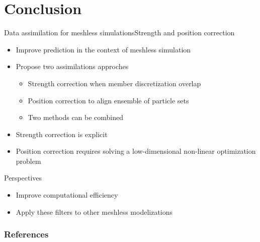 \documentclass[aspectratio=169]{beamer} %
\begin{document}
\section{Conclusion}
\begin{frame}{Data assimilation for meshless simulations}{Strength and position correction}

    \begin{itemize}
        \item Improve prediction in the context of meshless simulation
        \item Propose two assimilations approches
              \begin{itemize}
                  \item Strength correction when member discretization overlap
                  \item Position correction to align ensemble of particle sets
                  \item Two methods can be combined
              \end{itemize}
        \item Strength correction is explicit %
        \item Position correction requires solving a low-dimensional non-linear optimization problem
    \end{itemize}
    \vfill
    \begin{block}{Perspectives}
        \begin{itemize}
            \item Improve computational efficiency
            \item Apply these filters to other meshless modelizations
        \end{itemize}
    \end{block}
\end{frame}

\closingframe

\begin{frame}
    \frametitle{References}
    \printbibliography %
\end{frame}

\end{document}
